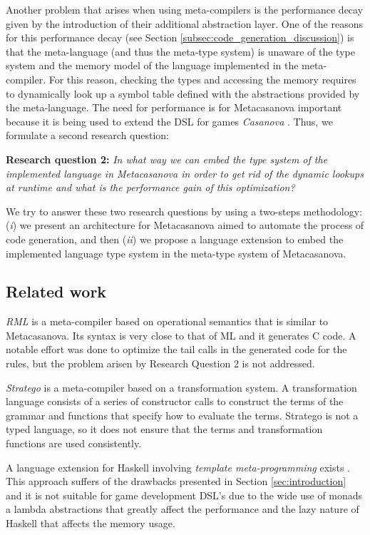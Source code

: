 \vspace{0.2cm}
Another problem that arises when using meta-compilers is the performance decay given by the introduction of their additional abstraction layer. One of the reasons for this performance decay (see Section \ref{subsec:code_generation_discussion}) is that the meta-language (and thus the meta-type system) is unaware of the type system and the memory model of the language implemented in the meta-compiler. For this reason, checking the types and accessing the memory requires to dynamically look up a symbol table defined with the abstractions provided by the meta-language. The need for performance is for Metacasanova important because it is being used to extend the DSL for games \textit{Casanova} \cite{abbadi2015casanova, abbadithesis2017}. Thus, we formulate a second research question:

\vspace{0.2cm}
\noindent
\textbf{Research question 2:} \textit{In what way we can embed the type system of the implemented language in Metacasanova in order to get rid of the dynamic lookups at runtime and what is the performance gain of this optimization?}

\vspace{0.2cm}
We try to answer these two research questions by using a two-steps methodology: (\textit{i}) we present an architecture for Metacasanova aimed to automate the process of code generation, and then (\textit{ii}) we propose a language extension to embed the implemented language type system in the meta-type system of Metacasanova.

\subsection{Related work}
\textit{RML} \cite{pettersson1996compiler} is a meta-compiler based on operational semantics that is similar to Metacasanova. Its syntax is very close to that of ML and it generates C code. A notable effort was done to optimize the tail calls in the generated code for the rules, but the problem arisen by Research Question 2 is not addressed.

\textit{Stratego} \cite{bravenboer2008stratego} is a meta-compiler based on a transformation system. A transformation language consists of a series of constructor calls to construct the terms of the grammar and functions that specify how to evaluate the terms. Stratego is not a typed language, so it does not ensure that the terms and transformation functions are used consistently.

A language extension for Haskell involving \textit{template meta-programming} exists \cite{sheard2002template}. This approach suffers of the drawbacks presented in Section \ref{sec:introduction} and it is not suitable for game development DSL's due to the wide use of monads a lambda abstractions that greatly affect the performance and the lazy nature of Haskell that affects the memory usage.